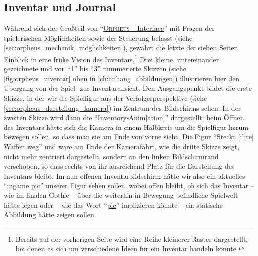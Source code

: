 \documentclass[a5paper,pagesize,numbers=noenddot]{scrbook}
\begin{document}
\subsection{Inventar und Journal}\label{sec:orpheus_darstellung_inventar}
Während sich der Großteil von \enquote{\uline{\textsc{Orpheus} -- Interface}} mit Fragen der spielerischen Möglichkeiten sowie der Steuerung befasst (siehe \autoref{sec:orpheus_mechanik_möglichkeiten}), gewährt die letzte der sieben Seiten Einblick in eine frühe Vision des Inventars.\footnote{Bereits auf der vorherigen Seite wird eine Reihe kleinerer Raster dargestellt, bei denen es sich um verschiedene Ideen für ein Inventar handeln könnte.}
Drei kleine, untereinander gezeichnete und von \enquote{1} bis \enquote{3} nummerierte Skizzen (siehe \autoref{fig:orpheus_inventar} oben in \autoref{ch:anhang_abbildungen}) illustrieren hier den Übergang von der Spiel- zur Inventar\-ansicht.
Den Ausgangspunkt bildet die erste Skizze, in der wir die Spielfigur aus der Verfolgerperspektive (siehe \autoref{sec:orpheus_darstellung_kamera}) im Zentrum des Bildschirms sehen.
In der zweiten Skizze wird dann die \enquote{Inventory-Anim[ation]} dargestellt; beim Öffnen des Inventars hätte sich die Kamera in einem Halbkreis um die Spielfigur herum bewegen sollen, so dass man sie am Ende von vorne sieht.
Die Figur \enquote{Steckt [ihre] Waffen weg} und wäre am Ende der Kamerafahrt, wie die dritte Skizze zeigt, nicht mehr zentriert dargestellt, sondern an den linken Bildschirmrand verschoben, so dass rechts von ihr ausreichend Platz für die Darstellung des Inventars bleibt.
Im nun offenen Inventarbildschirm hätte wir also ein aktuelles \enquote{ingame \uline{pic}} unserer Figur sehen sollen, wobei offen bleibt, ob sich das Inventar -- wie im finalen Gothic -- über die weiterhin in Bewegung befindliche Spielwelt hätte legen oder -- wie das Wort \enquote{\uline{pic}} implizieren könnte -- ein statische Abbildung hätte zeigen sollen.
\end{document}
